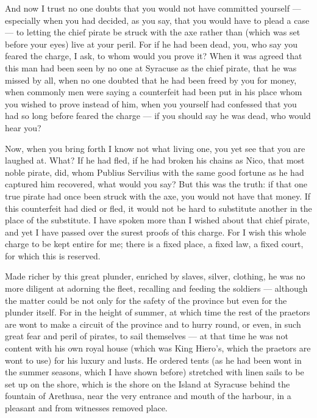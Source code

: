  And now I trust no one doubts that you would not have committed yourself --- especially when you had decided, as you say, that you would have to plead a case --- to letting the chief pirate be struck with the axe rather than (which was set before your eyes) live at your peril. For if he had been dead, you, who say you feared the charge, I ask, to whom would you prove it? When it was agreed that this man had been seen by no one at Syracuse as the chief pirate, that he was missed by all, when no one doubted that he had been freed by you for money, when commonly men were saying a counterfeit had been put in his place whom you wished to prove instead of him, when you yourself had confessed that you had so long before feared the charge --- if you should say he was dead, who would hear you?

 Now, when you bring forth I know not what living one, you yet see that you are laughed at. What? If he had fled, if he had broken his chains as Nico, that most noble pirate, did, whom Publius Servilius with the same good fortune as he had captured him recovered, what would you say? But this was the truth: if that one true pirate had once been struck with the axe, you would not have that money. If this counterfeit had died or fled, it would not be hard to substitute another in the place of the substitute. I have spoken more than I wished about that chief pirate, and yet I have passed over the surest proofs of this charge. For I wish this whole charge to be kept entire for me; there is a fixed place, a fixed law, a fixed court, for which this is reserved.

 Made richer by this great plunder, enriched by slaves, silver, clothing, he was no more diligent at adorning the fleet, recalling and feeding the soldiers --- although the matter could be not only for the safety of the province but even for the plunder itself. For in the height of summer, at which time the rest of the praetors are wont to make a circuit of the province and to hurry round, or even, in such great fear and peril of pirates, to sail themselves --- at that time he was not content with his own royal house (which was King Hiero's, which the praetors are wont to use) for his luxury and lusts. He ordered tents (as he had been wont in the summer seasons, which I have shown before) stretched with linen sails to be set up on the shore, which is the shore on the Island at Syracuse behind the fountain of Arethusa, near the very entrance and mouth of the harbour, in a pleasant and from witnesses removed place.

